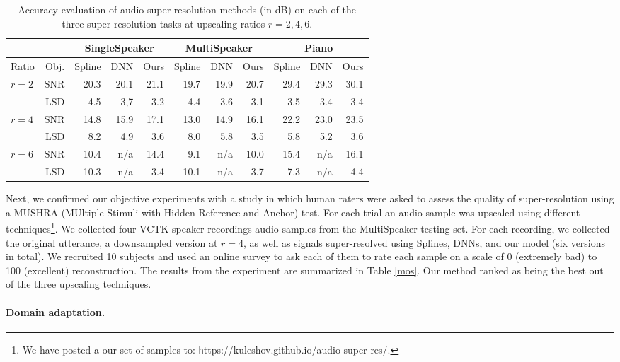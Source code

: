 \documentclass{article} \usepackage{iclr2017_workshop,times}
\begin{document}
\begin{table}[t]
\label{multispeaker}
\begin{center}
\begin{tabular}{lr|rrr|rrr|rrr}
& & \multicolumn{3}{c}{SingleSpeaker}  & \multicolumn{3}{c}{MultiSpeaker} & \multicolumn{3}{c}{Piano}                  \\
\hline
Ratio & Obj. & Spline & DNN & Ours  & Spline & DNN & Ours  & Spline & DNN & Ours \\
\hline
$r=2$    & SNR & 20.3 & 20.1 & 21.1 & 19.7 & 19.9 & 20.7 & 29.4 & 29.3 & 30.1 \\
    & LSD & 4.5 & 3,7 & 3.2 & 4.4 & 3.6 & 3.1 & 3.5 & 3.4 & 3.4 \\
$r=4$    & SNR & 14.8 & 15.9 & 17.1  & 13.0 & 14.9 & 16.1  & 22.2 & 23.0 & 23.5 \\
    & LSD & 8.2 & 4.9 & 3.6  & 8.0 & 5.8 & 3.5 & 5.8 & 5.2 & 3.6 \\
$r=6$    & SNR & 10.4 & n/a & 14.4  & 9.1 & n/a & 10.0 & 15.4 & n/a & 16.1 \\
    & LSD & 10.3 & n/a & 3.4  & 10.1 & n/a & 3.7 & 7.3 & n/a & 4.4 \\
\end{tabular}
\end{center}
\caption{Accuracy evaluation of audio-super resolution methods (in dB) on each of the three super-resolution tasks at upscaling ratios $r=2,4,6$.}
\end{table}


Next, we confirmed our objective experiments with a study in which human raters were asked to assess the quality of super-resolution using a MUSHRA (MUltiple Stimuli with Hidden Reference and Anchor) test. For each trial an audio sample was upscaled using different techniques\footnote{We have posted a our set of samples to: {\texttt https://kuleshov.github.io/audio-super-res/}.}. We collected four VCTK speaker recordings audio samples from the {\sc MultiSpeaker} testing set. For each recording, we collected the original utterance, a downsampled version at $r=4$, as well as signals super-resolved using Splines, DNNs, and our model (six versions in total). We recruited 10 subjects and used an online survey to ask each of them to rate each sample on a scale of 0 (extremely bad) to 100 (excellent) reconstruction.
The results from the experiment are summarized in Table \ref{mos}.
Our method ranked as being the best out of the three upscaling techniques.

\paragraph{Domain adaptation.}
\end{document}
